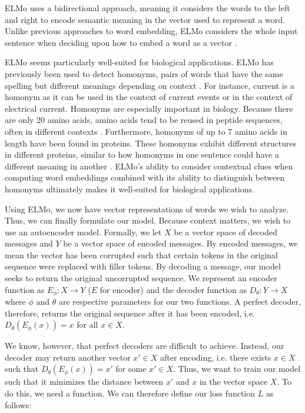 \documentclass{SBCbookchapter}
\begin{document}
\newpage
ELMo uses a bidirectional approach, meaning it considers the words to the left and right to encode semantic meaning in the vector used to represent a word. Unlike previous approaches to word embedding, 
ELMo considers the whole input sentence when deciding upon how to embed a word as a vector \cite{peters_deep_2018}. 

ELMo seems particularly well-suited for biological applications. ELMo has previously been used to detect homonyms, pairs of words that have the same spelling but different meanings depending on context 
\cite{lee_systematic_2021}. For instance, current is a homonym as it can be used in the context of current events or in the context of electrical current. Homonyms are especially important in biology. 
Because there are only 20 amino acids, amino acids tend to be reused in peptide sequences, often in different contexts \cite{bepler_learning_2021}. Furthermore, homonyms of up to 7 amino acids in length 
have been found in proteins. These homonyms exhibit different structures in different proteins, similar to how homonyms in one sentence could have a different meaning in another 
\cite{gatherer_peptide_2007}. ELMo's ability to consider contextual clues when computing word embeddings combined with its ability to distinguish between homonyms ultimately makes it well-suited for 
biological applications. 

Using ELMo, we now have vector representations of words we wish to analyze. Thus, we can finally formulate our model. Because context matters, we wish to use an autoencoder model. Formally, we let $X$ 
be a vector space of decoded messages and $Y$ be a vector space of encoded messages. By encoded messages, we mean the vector has been corrupted such that certain tokens in the original sequence were 
replaced with filler tokens. By decoding a message, our model seeks to return the original uncorrupted sequence. We represent an encoder function as $E_\phi : X \rightarrow Y$ ($E$ for encoder) and the 
decoder function as $D_\theta: Y \rightarrow X$ where $\phi$ and $\theta$ are respective parameters for our two functions. A perfect decoder, therefore, returns the original sequence after it has been 
encoded, i.e. $D_\theta(E_\phi(x)) = x$ for all $x \in X$. 


We know, however, that perfect decoders are difficult to achieve. Instead, our decoder may return another vector $x' \in X$ after encoding, i.e. there exists $x \in X$ such that $D_\theta(E_\phi(x)) = 
x'$ for some $x' \in X$. Thus, we want to train our model such that it minimizes the distance between $x'$ and $x$ in the vector space $X$. To do this, we need a function. We can therefore define our 
loss function $L$ as follows:
\end{document}
